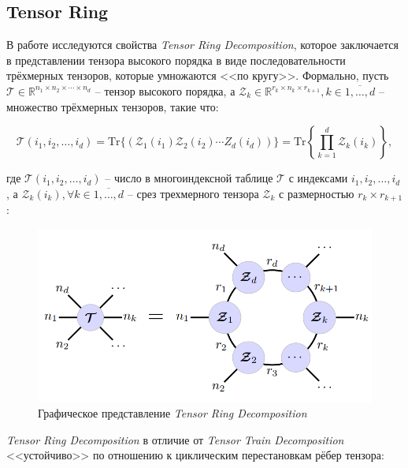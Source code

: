 \subsection{Tensor Ring}


В работе \cite{DBLP:journals/corr/ZhaoZXZC16} исследуются свойства \textit{Tensor Ring Decomposition}, которое заключается в представлении тензора высокого порядка в виде последовательности трёхмерных тензоров, которые умножаются <<по кругу>>. Формально, пусть $\mathcal{T} \in \mathbb{R}^{n_1 \times n_2 \times \dotsm \times n_d}$ -- тензор высокого порядка, а $\mathcal{Z}_k \in \mathbb{R}^{r_k \times n_k \times r_{k + 1}}, k \in \overline{1, \dotsc, d}$ -- множество трёхмерных тензоров, такие что:

\begin{equation}\label{TRDecomp}
    \mathcal{T}(i_1, i_2, \dotsc, i_d) = \text{Tr}\{(\mathcal{Z}_1(i_1)\mathcal{Z}_2(i_2) \dotsm Z_d(i_d))\} = \text{Tr}\left\{\prod_{k=1}^d \mathcal{Z}_k(i_k)\right\},
\end{equation}

где $\mathcal{T}(i_1, i_2, \dotsc, i_d)$ -- число в многоиндексной таблице $\mathcal{T}$ с  индексами $i_1, i_2, \dotsc, i_d$, а  $\mathcal{Z}_k(i_k), \forall k \in \overline{1, \dotsc, d}$ -- срез трехмерного тензора $\mathcal{Z}_k$ с размерностью  $r_k \times r_{k + 1}$:

\begin{figure}[h!tp]
    \centering
    \includegraphics[scale=0.5]{TensorRing/DecompTR.PNG}
    \caption{Графическое представление \textit{Tensor Ring Decomposition}}
    \label{fig:TRDecomp}
\end{figure}


\textit{Tensor Ring Decomposition} в отличие от \textit{Tensor Train Decomposition} <<устойчиво>> по отношению к циклическим перестановкам рёбер тензора:


